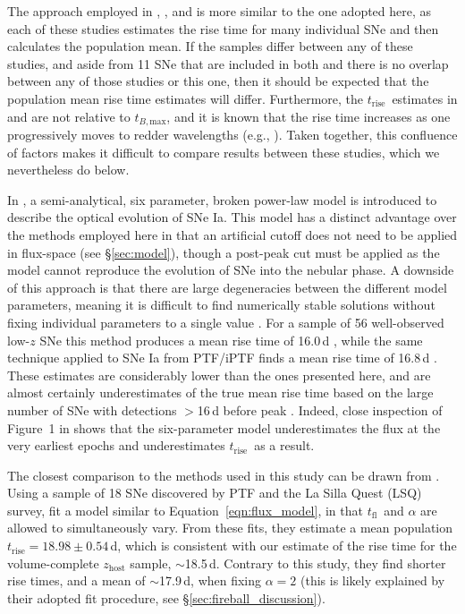 \documentclass[twocolumn]{./aastex63}
\newcommand{\tfl}{$t_\mathrm{fl}$}
\newcommand{\trise}{$t_\mathrm{rise}$}
\newcommand{\tbmax}{$t_{B,\mathrm{max}}$}
\begin{document}
The approach employed in \citet{Zheng17a}, \citet{Papadogiannakis19}, and
\citet{Firth15} is more similar to the one adopted here, as each of these
studies estimates the rise time for many individual SNe and then calculates
the population mean. If the samples differ between any of these studies, and
aside from 11 SNe that are included in both \citet{Papadogiannakis19} and
\citet{Firth15} there is no overlap between any of those studies or this one,
then it should be expected that the population mean rise time estimates will
differ. Furthermore, the \trise\ estimates in \citet{Papadogiannakis19} and
\citet{Firth15} are not relative to \tbmax, and it is known that the rise time
increases as one progressively moves to redder wavelengths (e.g.,
\citealt{Ganeshalingam11}). Taken together, this confluence of factors makes
it difficult to compare results between these studies, which we nevertheless
do below.

In \citet{Zheng17}, a semi-analytical, six parameter, broken power-law model
is introduced to describe the optical evolution of SNe Ia. This model has a
distinct advantage over the methods employed here in that an artificial cutoff
does not need to be applied in flux-space (see \S\ref{sec:model}), though a
post-peak cut must be applied as the model cannot reproduce the evolution of
SNe into the nebular phase. A downside of this approach is that there are
large degeneracies between the different model parameters, meaning it is
difficult to find numerically stable solutions without fixing individual
parameters to a single value \citep{Zheng17a}. For a sample of 56
well-observed low-$z$ SNe this method produces a mean rise time of 16.0\,d
\citep{Zheng17a}, while the same technique applied to SNe Ia from PTF/iPTF
finds a mean rise time of 16.8\,d \citep{Papadogiannakis19}. These estimates
are considerably lower than the ones presented here, and are almost certainly
underestimates of the true mean rise time based on the large number of SNe
with detections $>$16\,d before peak \citep{Papadogiannakis19, Yao19}. Indeed,
close inspection of Figure~1 in \citet{Zheng17a} shows that the six-parameter
model underestimates the flux at the very earliest epochs and underestimates
\trise\ as a result.

The closest comparison to the methods used in this study can be drawn from
\citet{Firth15}. Using a sample of 18 SNe discovered by PTF and the La Silla
Quest (LSQ) survey, \citeauthor{Firth15} fit a model similar to
Equation~\ref{eqn:flux_model}, in that \tfl\ and $\alpha$ are allowed to
simultaneously vary. From these fits, they estimate a mean population \trise$
= 18.98 \pm 0.54$\,d, which is consistent with our estimate of the rise time
for the volume-complete $z_\mathrm{host}$ sample, $\sim$18.5\,d. Contrary to
this study, they find shorter rise times, and a mean of $\sim$17.9\,d, when
fixing $\alpha = 2$ (this is likely explained by their adopted fit procedure,
see \S\ref{sec:fireball_discussion}).
\end{document}
